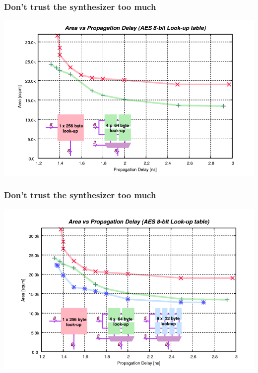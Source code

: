 \documentclass[compress]{beamer}
\begin{document}
\begin{frame}
	\frametitle{Don’t trust the synthesizer too much}
	\begin{center}
		\includegraphics[width=\textwidth]{synthesizer2}
	\end{center}
\end{frame}
\begin{frame}
	\frametitle{Don’t trust the synthesizer too much}
	\begin{center}
		\includegraphics[width=\textwidth]{synthesizer3}
	\end{center}
\end{frame}
\end{document}
